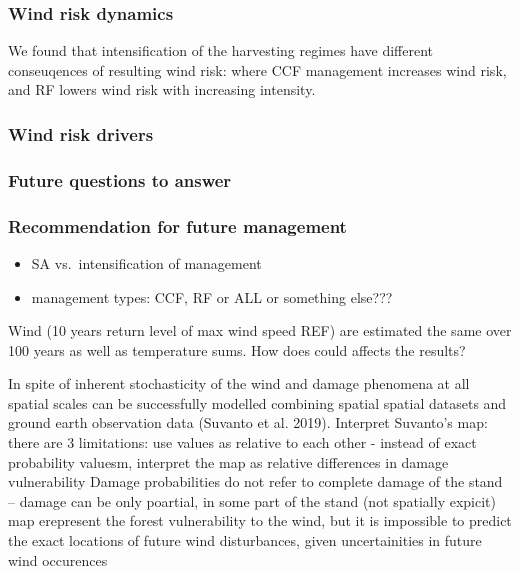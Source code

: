 \documentclass[]{elsarticle} %
\providecommand{\tightlist}{%
  \setlength{\itemsep}{0pt}\setlength{\parskip}{0pt}}
\begin{document}
\subsubsection{Wind risk dynamics}\label{wind-risk-dynamics}

We found that intensification of the harvesting regimes have different
conseuqences of resulting wind risk: where CCF management increases wind
risk, and RF lowers wind risk with increasing intensity.

\subsubsection{Wind risk drivers}\label{wind-risk-drivers}

\subsubsection{Future questions to
answer}\label{future-questions-to-answer}

\subsubsection{Recommendation for future
management}\label{recommendation-for-future-management}

\begin{itemize}
\tightlist
\item
  SA vs.~intensification of management
\item
  management types: CCF, RF or ALL or something else???
\end{itemize}

Wind (10 years return level of max wind speed REF) are estimated the
same over 100 years as well as temperature sums. How does could affects
the results?

In spite of inherent stochasticity of the wind and damage phenomena at
all spatial scales can be successfully modelled combining spatial
spatial datasets and ground earth observation data (Suvanto et al.
2019). Interpret Suvanto's map: there are 3 limitations: use values as
relative to each other - instead of exact probability valuesm, interpret
the map as relative differences in damage vulnerability Damage
probabilities do not refer to complete damage of the stand -- damage can
be only poartial, in some part of the stand (not spatially expicit) map
erepresent the forest vulnerability to the wind, but it is impossible to
predict the exact locations of future wind disturbances, given
uncertainities in future wind occurences
\end{document}
